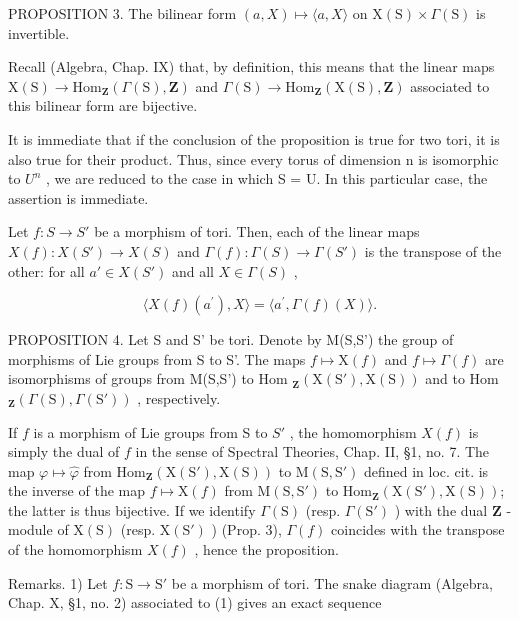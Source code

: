 PROPOSITION 3. The bilinear form \((a,X)\mapsto \langle a,X\rangle\) on \(\mathrm{X(S)}\times \Gamma (\mathrm{S})\) is invertible.

Recall (Algebra, Chap. IX) that, by definition, this means that the linear maps \(\mathrm{X}(\mathrm{S}) \to \mathrm{Hom}_{\mathbf{Z}}(\varGamma(\mathrm{S}), \mathbf{Z})\) and \(\varGamma(\mathrm{S}) \to \mathrm{Hom}_{\mathbf{Z}}(\mathrm{X}(\mathrm{S}), \mathbf{Z})\) associated to this bilinear form are bijective.

It is immediate that if the conclusion of the proposition is true for two tori, it is also true for their product. Thus, since every torus of dimension n is isomorphic to \(U^{n}\) , we are reduced to the case in which S = U. In this particular case, the assertion is immediate.

Let \(f: S \to S'\) be a morphism of tori. Then, each of the linear maps \(X(f): X(S') \to X(S)\) and \(\Gamma(f): \Gamma(S) \to \Gamma(S')\) is the transpose of the other: for all \(a' \in X(S')\) and all \(X \in \Gamma(S)\) ,

\[
\langle X (f) (a ^ {\prime}), X \rangle = \langle a ^ {\prime}, \Gamma (f) (X) \rangle .\tag{3}
\]

PROPOSITION 4. Let S and S' be tori. Denote by M(S,S') the group of morphisms of Lie groups from S to S'. The maps \(f \mapsto \mathrm{X}(f)\) and \(f \mapsto \Gamma(f)\) are isomorphisms of groups from M(S,S') to Hom \(_{\mathbf{Z}}(\mathrm{X}(\mathrm{S}'),\mathrm{X}(\mathrm{S}))\) and to Hom \(_{\mathbf{Z}}(\Gamma(\mathrm{S}),\Gamma(\mathrm{S}'))\) , respectively.

If \(f\) is a morphism of Lie groups from S to \(S'\) , the homomorphism \(X(f)\) is simply the dual of \(f\) in the sense of Spectral Theories, Chap. II, §1, no. 7. The map \(\varphi \mapsto \hat{\varphi}\) from \(\mathrm{Hom}_{\mathbf{Z}}(\mathrm{X}(\mathrm{S}'), \mathrm{X}(\mathrm{S}))\) to \(\mathrm{M}(\mathrm{S},\mathrm{S}')\) defined in loc. cit. is the inverse of the map \(f \mapsto \mathrm{X}(f)\) from \(\mathrm{M}(\mathrm{S},\mathrm{S}')\) to \(\mathrm{Hom}_{\mathbf{Z}}(\mathrm{X}(\mathrm{S}'), \mathrm{X}(\mathrm{S}))\); the latter is thus bijective. If we identify \(\Gamma(\mathrm{S})\) (resp. \(\Gamma(\mathrm{S}')\) ) with the dual \(\mathbf{Z}\) -module of \(\mathrm{X}(\mathrm{S})\) (resp. \(\mathrm{X}(\mathrm{S}')\) ) (Prop. 3), \(\Gamma(f)\) coincides with the transpose of the homomorphism \(X(f)\) , hence the proposition.

Remarks. 1) Let \(f: \mathrm{S} \to \mathrm{S}'\) be a morphism of tori. The snake diagram (Algebra, Chap. X, §1, no. 2) associated to (1) gives an exact sequence


